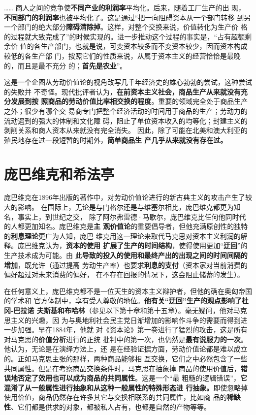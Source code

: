 …… 商人之间的竞争使\textbf{不同产业的利润率}平均化。后来，随着工厂生产的出
现，\textbf{不同部门的利润率}也被平均化了。这是通过“把一向阻碍资本从一个部门转移
到另一个部门的绝大部分\textbf{障碍清除掉}。这样，对整个交换来说，价值转化为生产价
格的过程就大致完成了”的时候实现的。进一步推动这个过程的事实是，“占有超额剩余价
值的各生产部门，也就是说，可变资本较多而不变资本较少，因而资本构成较低的各生产部
门，按照它们的性质来说，从属于资本主义的经营恰恰是最晚的，而且是最不充分
的；\textbf{首先是农业}”。

这是一个企图从劳动价值论的视角改写几千年经济史的雄心勃勃的尝试，这种尝试的失败并
不奇怪。现代批评者认为，\textbf{在前资本主义社会，商品生产从来就没有充分发展到按
  照商品的劳动价值比率相交换的程度}。重要的领域完全处于商品生产之外；很少有哪个交
易商专门把整个经济活动的时间用于商品的生产；劳动力的流动遇到的强大的体制和文化障
碍，阻止了单位资本收入的均等化；封建主义的剥削关系和商人资本从来就没有完全消失。
因此，除了可能在北美和澳大利亚的殖民地存在过一段短暂的时期外，\textbf{简单商品生
  产几乎从来就没有存在过。}

\section{庞巴维克和希法亭}
庞巴维克在1896年出版的著作中，对劳动价值论进行的新古典主义的攻击产生了较大的影响。
在国际上，无论是与门格尔还是与维塞尔相比，庞巴维克都更为知名，事实上，到世纪之交，
除了阿尔弗雷德·马歇尔，庞巴维克比任何他同时代的人都更加知名。庞巴维克是\textbf{主
  观价值论}的重要倡导者，但他充满原创性的独特的\textbf{利息理论}更广为人知，庞巴
维克用这一理论来取代马克思对资本主义利润的解释。庞巴维克认为，\textbf{资本的使用
  扩展了生产的时间结构}，使得使用更加“\textbf{迂回}”的生产技术成为可能。由
此\textbf{导致的投入的使用和最终产出的出现之间的时间间隔的增加}，既允许（通过提高
劳动生产率）也要求\textbf{利息的支付}（资本家对当前消费的偏好超过对未来消费的偏好，
在不存在回报的情况下，这会阻止储蓄的发生）。

在任何意义上，庞巴维克都不是一位天生的资本主义辩护者，但他的确在奥匈帝国的学术和
官方体制中，享有受人尊敬的地位。\textbf{他有关“迂回”生产的观点影响了杜冈-巴拉诺
  夫斯基和布哈林}（参见以下第十章和第十五章）。毫无疑问，他对马克思主义的兴趣，因
为与奥地利社会民主党日渐增加的影响作斗争的需要而得到进一步加强。早在1884年，他就
对《资本论》第一卷进行了猛烈的攻击，这是所有对马克思的\textbf{价值分析}进行的正统
批判中的第一次，也仍然是\textbf{最有说服力的一次}。他认为，无论是在演绎方法上，还
是在经验证据方面，劳动价值论都是难以成立的。正如马克思主张的那样，两种商品能够相
互交换，它们之中必然包含了一些共同属性。但是在考察商品交换条件时，马克思在抽象掉
商品的使用价值后，\textbf{错误地否定了效用也可以成为商品的共同属性}。这是一个“最
粗糙的逻辑错误”，\textbf{它混淆了从一般属性进行抽象和从这种一般属性的特殊形态进
  行抽象。}即使忽略掉使用价值，商品仍然存在许多其它与交换相联系的共同属性，比如商
品的\textbf{稀缺性}、它们都是供求的对象，都被私人占有，也都是自然的产物等等。

